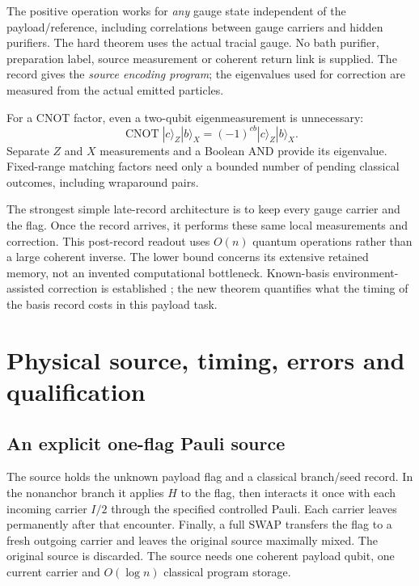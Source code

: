 \documentclass[11pt]{article}
\begin{document}
The positive operation works for \emph{any} gauge state independent of the
payload/reference, including correlations between gauge carriers and hidden
purifiers. The hard theorem uses the actual tracial gauge. No bath purifier,
preparation label, source measurement or coherent return link is supplied.
The record gives the \emph{source encoding program}; the eigenvalues used for
correction are measured from the actual emitted particles.

For a CNOT factor, even a two-qubit eigenmeasurement is unnecessary:
\begin{equation}
 \operatorname{CNOT}|c\rangle_Z|b\rangle_X=(-1)^{cb}|c\rangle_Z|b\rangle_X.
\end{equation}
Separate $Z$ and $X$ measurements and a Boolean AND provide its eigenvalue.
Fixed-range matching factors need only a bounded number of pending classical
outcomes, including wraparound pairs.

The strongest simple late-record architecture is to keep every gauge carrier
and the flag. Once the record arrives, it performs these same local
measurements and correction. This post-record readout uses $O(n)$ quantum
operations rather than a large coherent inverse. The lower bound concerns its extensive
retained memory, not an invented computational bottleneck. Known-basis
environment-assisted correction is established \cite{gw}; the new theorem
quantifies what the timing of the basis record costs in this payload task.

\section{Physical source, timing, errors and qualification}\label{sec:bill}

\subsection{An explicit one-flag Pauli source}
The source holds the unknown payload flag and a classical branch/seed record.
In the nonanchor branch it applies $H$ to the flag, then interacts it once with
each incoming carrier $I/2$ through the specified controlled Pauli. Each carrier
leaves permanently after that encounter. Finally, a full SWAP transfers the flag
to a fresh outgoing carrier and leaves the original source maximally mixed.
The original source is discarded. The source needs one coherent payload qubit,
one current carrier and $O(\log n)$ classical program storage.
\end{document}
